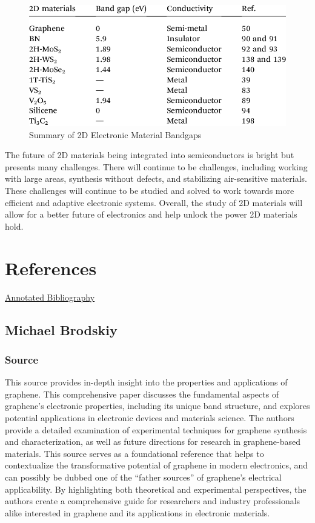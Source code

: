 \documentclass[conference]{IEEEtran}
\begin{document}
\begin{figure}[h]
  \centering
  \includegraphics[width=.5\textwidth]{Figures/SummaryTable}
  \caption{Summary of 2D Electronic Material Bandgaps}
  \label{fig:4}
\end{figure}

The future of 2D materials being integrated into semiconductors is bright but presents many challenges. There will continue to be challenges, including working with large areas, synthesis without defects, and stabilizing air-sensitive materials. These challenges will continue to be studied and solved to work towards more efficient and adaptive electronic systems. Overall, the study of 2D materials will allow for a better future of electronics and help unlock the power 2D materials hold.

\newpage

\section*{}

\newpage

\section*{References}

\begin{center}
  \underline{Annotated Bibliography}
\end{center}

\subsection{Michael Brodskiy}

\subsubsection{Source \cite{mb4}}

This source provides in-depth insight into the properties and applications of graphene. This comprehensive paper discusses the fundamental aspects of graphene's electronic properties, including its unique band structure, and explores potential applications in electronic devices and materials science. The authors provide a detailed examination of experimental techniques for graphene synthesis and characterization, as well as future directions for research in graphene-based materials. This source serves as a foundational reference that helps to contextualize the transformative potential of graphene in modern electronics, and can possibly be dubbed one of the ``father sources'' of graphene's electrical applicability. By highlighting both theoretical and experimental perspectives, the authors create a comprehensive guide for researchers and industry professionals alike interested in graphene and its applications in electronic materials.
\end{document}
